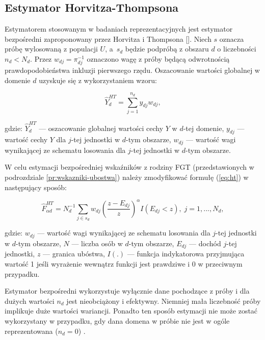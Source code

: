 \subsection{Estymator Horvitza-Thompsona}\label{estymator-horvitza-thompsona}

Estymatorem stosowanym w badaniach reprezentacyjnych jest estymator bezpośredni zaproponowany przez Horvitza i Thompsona [\citeyear{ht1952}]. Niech $s$ oznacza próbę wylosowaną z populacji $U$, a~$s_d$ będzie podpróbą z obszaru $d$ o liczebności $n_d < N_d$. Przez $w_{dj}=\pi_{dj}^{-1}$ oznaczono wagę z próby będącą odwrotnością prawdopodobieństwa inkluzji pierwszego rzędu. Oszacowanie wartości globalnej w domenie $d$ uzyskuje się z wykorzystaniem wzoru:

\begin{equation}
\hat{Y}^{HT}_{d}=\sum\limits_{j=1}^{n_d}{y_{dj} w_{dj}},
\label{eq:ht}
\end{equation}

gdzie: $\hat{Y}^{HT}_{d}$ --- oszacowanie globalnej wartości cechy $Y$ w $d$-tej domenie, $y_{dj}$ --- wartość cechy $Y$ dla $j$-tej jednostki w $d$-tym obszarze, $w_{dj}$ --- wartość wagi wynikającej ze schematu losowania dla $j$-tej jednostki w $d$-tym obszarze.

W celu estymacji bezpośredniej wskaźników z rodziny FGT (przedstawionych w podrozdziale \ref{pr:wskazniki-ubostwa}) należy zmodyfikować formułę (\ref{eq:ht}) w następujący sposób:

\begin{equation}
\hat{F}_{\alpha d}^{HT}=N^{-1}_{d}\sum_{j \in s_d}{w_{dj}\left(\frac{z - E_{dj}}{z}\right)^{\alpha}I(E_{dj}<z)}, \; j=1, ..., N_d,
\label{eq:ht_fgt}
\end{equation}

gdzie: $w_{dj}$ --- wartość wagi wynikającej ze schematu losowania dla $j$-tej jednostki w $d$-tym obszarze, $N$ --- liczba osób w $d$-tym obszarze, $E_{dj}$ --- dochód $j$-tej jednostki, $z$ --- granica ubóstwa, $I(.)$ --- funkcja indykatorowa przyjmująca wartość 1 jeśli wyrażenie wewnątrz funkcji jest prawdziwe i 0 w przeciwnym przypadku.

Estymator bezpośredni wykorzystuje wyłącznie dane pochodzące z próby i dla dużych wartości $n_d$ jest nieobciążony i efektywny. Niemniej mała liczebność próby implikuje duże wartości wariancji. Ponadto ten sposób estymacji nie może zostać wykorzystany w przypadku, gdy dana domena w próbie nie jest w ogóle reprezentowana ($n_d=0$) \citep{molina2016}.

